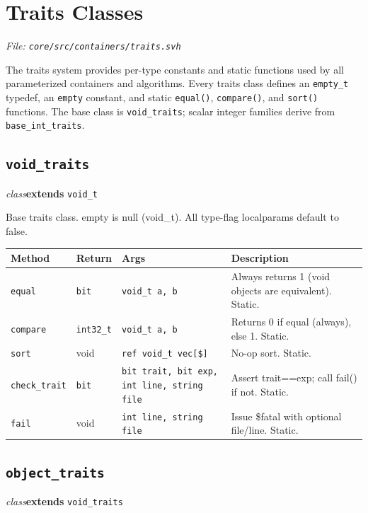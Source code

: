 \documentclass[11pt,letterpaper]{report}
\begin{document}
\section{Traits Classes}
\noindent\small\textit{File: \texttt{core/src/containers/traits.svh}}\par

The traits system provides per-type constants and static functions used by all parameterized containers and algorithms. Every traits class defines an \texttt{empty\_t} typedef, an \texttt{empty} constant, and static \texttt{equal()}, \texttt{compare()}, and \texttt{sort()} functions. The base class is \texttt{void\_traits}; scalar integer families derive from \texttt{base\_int\_traits}.

\subsection*{\texttt{void\_traits}}
\noindent\small\textit{class}\quad \textbf{extends} \texttt{void\_t}\par

Base traits class. empty is null (void\_t). All type-flag localparams default to false.

\begin{xltabular}{\linewidth}{>{\small}p{1.35in} >{\small}p{1.25in} >{\small}p{0.95in} >{\small}X}
\toprule
\textbf{Method} & \textbf{Return} & \textbf{Args} & \textbf{Description} \\
\midrule
\endhead
\bottomrule
\endfoot
\texttt{equal} & \texttt{bit} & \texttt{void\_t a, b} & Always returns 1 (void objects are equivalent). Static. \\
\texttt{compare} & \texttt{int32\_t} & \texttt{void\_t a, b} & Returns 0 if equal (always), else 1. Static. \\
\texttt{sort} & void & \texttt{ref void\_t vec[\$]} & No-op sort. Static. \\
\texttt{check\_trait} & \texttt{bit} & \texttt{bit trait, bit exp, int line, string file} & Assert trait==exp; call fail() if not. Static. \\
\texttt{fail} & void & \texttt{int line, string file} & Issue \$fatal with optional file/line. Static. \\
\end{xltabular}

\subsection*{\texttt{object\_traits}}
\noindent\small\textit{class}\quad \textbf{extends} \texttt{void\_traits}\par
\end{document}
